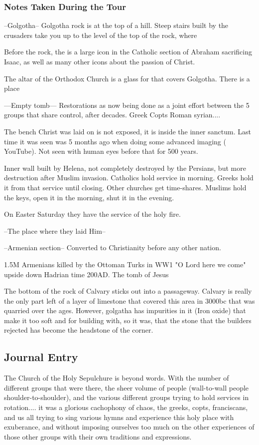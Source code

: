 \documentclass[letterpaper]{report}
\begin{document}
\subsubsection{Notes Taken During the Tour}
--Golgotha--
Golgotha rock is at the top of a hill. Steep stairs built by the crusaders take you up to the level of the top of the rock, where 

Before the rock, the is a large icon in the Catholic section of Abraham sacrificing Isaac, as well as many other icons about the passion of Christ. 

The altar of the Orthodox Church is a glass for that covers Golgotha. There is a place

---Empty tomb---
Restorations as now being done as a joint effort between the 5 groups that share control, after decades. Greek Copts Roman syrian....

The bench Christ was laid on is not exposed, it is inside the inner sanctum. Last time it was seen was 5 months ago when doing some advanced imaging ( YouTube). Not seen with human eyes before that for 500 years.

Inner wall built by Helena, not completely destroyed by the Persians, but more destruction after Muslim invasion.
Catholics hold service in morning. Greeks hold it from that service until closing. Other churches get time-shares.
Muslims hold the keys, open it in the morning, shut it in the evening.

On Easter Saturday they have the service of the holy fire. 

--The place where they laid Him--

--Armenian section--
Converted to Christianity before any other nation.

1.5M Armenians killed by the Ottoman Turks in WW1
"O Lord here we come" upside down Hadrian time 200AD. The tomb of Jesus 

The bottom of the rock of Calvary sticks out into a passageway. Calvary is really the only part left of a layer of limestone that covered this area in 3000bc that was quarried over the ages.
However, golgatha has impurities in it (Iron oxide)
that make it too soft and  for building with,
so it was, that the stone that the builders rejected has become the headstone of the corner.

\clearpage
\subsection{Journal Entry}
The Church of the Holy Sepulchure is beyond words.
With the number of different
groups that were there,
the sheer volume of people (wall-to-wall people shoulder-to-shoulder),
and the various different groups trying to hold services in rotation.... it was a glorious cachophony of chaos, the greeks, copts, franciscans, and us all trying to sing various hymns and experience this holy place with exuberance, and without imposing ourselves too much on the other experiences of those other groups with their own traditions and expressions.
\end{document}
